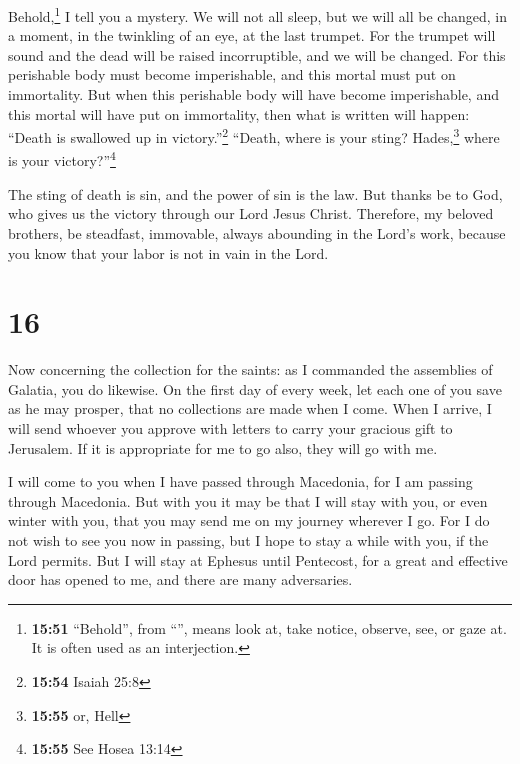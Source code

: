  Behold,\footnote{\textbf{15:51} ``Behold'', from
  ``'', means look at, take notice, observe, see, or gaze
  at. It is often used as an interjection.} I tell you a mystery. We
will not all sleep, but we will all be changed,  in a
moment, in the twinkling of an eye, at the last trumpet. For the trumpet
will sound and the dead will be raised incorruptible, and we will be
changed.  For this perishable body must become
imperishable, and this mortal must put on immortality. 
But when this perishable body will have become imperishable, and this
mortal will have put on immortality, then what is written will happen:
``Death is swallowed up in victory.''\footnote{\textbf{15:54} Isaiah
  25:8}  ``Death, where is your sting? Hades,\footnote{\textbf{15:55}
  or, Hell} where is your victory?''\footnote{\textbf{15:55} See Hosea
  13:14}

 The sting of death is sin, and the power of sin is the
law.  But thanks be to God, who gives us the victory
through our Lord Jesus Christ.  Therefore, my beloved
brothers, be steadfast, immovable, always abounding in the Lord's work,
because you know that your labor is not in vain in the Lord.

\hypertarget{section-15}{%
\section{16}\label{section-15}}

 Now concerning the collection for the saints: as I
commanded the assemblies of Galatia, you do likewise.  On
the first day of every week, let each one of you save as he may prosper,
that no collections are made when I come.  When I arrive,
I will send whoever you approve with letters to carry your gracious gift
to Jerusalem.  If it is appropriate for me to go also,
they will go with me.

 I will come to you when I have passed through Macedonia,
for I am passing through Macedonia.  But with you it may
be that I will stay with you, or even winter with you, that you may send
me on my journey wherever I go.  For I do not wish to see
you now in passing, but I hope to stay a while with you, if the Lord
permits.  But I will stay at Ephesus until Pentecost,
 for a great and effective door has opened to me, and
there are many adversaries.


